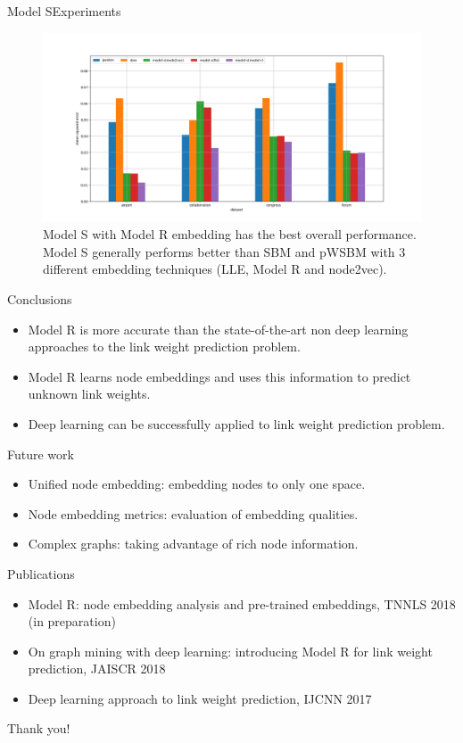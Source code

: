 \documentclass{beamer}
\begin{document}
\begin{frame}{Model S}{Experiments}
	\begin{figure}[ht] \centering
		\includegraphics[width=1\linewidth]{weight-errors}
		\caption{
			Model S with Model R embedding has the best overall performance. Model S generally performs better than SBM and pWSBM with 3 different embedding techniques (LLE, Model R and node2vec).
		}
		\label{fig:weight-errors}
	\end{figure}
\end{frame}

\begin{frame}{Conclusions}
	\begin{itemize}
		\item Model R is more accurate than the state-of-the-art non deep learning approaches to the link weight prediction problem.
		\item Model R learns node embeddings and uses this information to predict unknown link weights.
		\item Deep learning can be successfully applied to link weight prediction problem.
	\end{itemize}
\end{frame}

\begin{frame}{Future work}
	\begin{itemize}
		\item Unified node embedding: embedding nodes to only one space.
		\item Node embedding metrics: evaluation of embedding qualities.
		\item Complex graphs: taking advantage of rich node information.
	\end{itemize}
\end{frame}

\begin{frame}{Publications}
	\begin{itemize}
		\item Model R: node embedding analysis and pre-trained embeddings, TNNLS 2018 (in preparation)
		\item On graph mining with deep learning: introducing Model R for link weight prediction, JAISCR 2018
		\item Deep learning approach to link weight prediction, IJCNN 2017
	\end{itemize}
\end{frame}

\begin{frame}
	\begin{center}
		\Huge Thank you!
	\end{center}
\end{frame}
\end{document}
